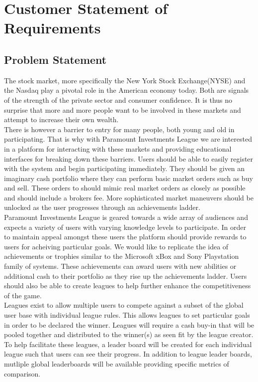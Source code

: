 \chapter{Customer Statement of Requirements}

\section{Problem Statement}

The stock market, more specifically the New York Stock
Exchange(NYSE) and the Nasdaq play a pivotal role in the American
economy today. Both are signals of the strength of the private
sector and consumer confidence. It is thus no surprise that
more and more people want to be involved in these markets
and attempt to increase their own wealth.\\

There is however a barrier to entry for many people, both
young and old in participating.  That is why with Paramount
Investments League we are interested in a platform for interacting
with these markets and providing educational interfaces for
breaking down these barriers.  Users should be able to easily
register with the system and begin participating immediately.
They should be given an imaginary cash portfolio where they can
perform basic market orders such as buy and sell. These orders to
should mimic real market orders as closely as possible and should
include a brokers fee. More sophisticated market maneuvers should be
unlocked as the user progresses through an achievements ladder.\\

Paramount Investments League is geared towards a wide array
of audiences and expects a variety of users with varying knowledge
levels to participate. In order to maintain appeal amongst these
users the platform should provide rewards to users for acheiving
particular goals.  We would like to replicate the idea of
achievements or trophies similar to the Microsoft xBox and Sony
Playstation family of systems. These achievements can award users
with new abilities or additional cash to their portfolio as they rise
up the achievements ladder. Users should also be able to create leagues
to help further enhance the competitiveness of the game.\\

Leagues exist to allow multiple users to compete against a subset
of the global user base with individual league rules.  This allows leagues
to set particular goals in order to be declared the winner.  Leagues
will require a cash buy-in that will be pooled together and distributed
to the winner(s) as seen fit by the league creator. To help facilitate
these leagues, a leader board will be created for each individual league
such that users can see their progress. In addition to league leader boards,
mutliple global leaderboards will be available providing specific metrics
of comparison.\\

